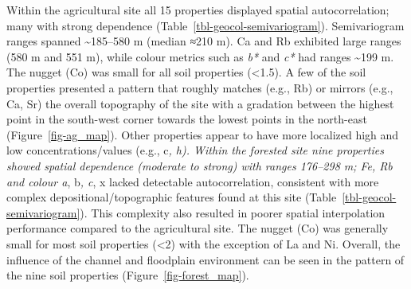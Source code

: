 \documentclass[
  number]{elsarticle}
\begin{document}
Within the agricultural site all 15 properties displayed spatial
autocorrelation; many with strong dependence
(Table~\ref{tbl-geocol-semivariogram}). Semivariogram ranges spanned
\textasciitilde185--580 m (median ≈210 m). Ca and Rb exhibited large
ranges (580 m and 551 m), while colour metrics such as \emph{b*} and
\emph{c*} had ranges \textasciitilde199 m. The nugget (Co) was small for
all soil properties (\textless1.5). A few of the soil properties
presented a pattern that roughly matches (e.g., Rb) or mirrors (e.g.,
Ca, Sr) the overall topography of the site with a gradation between the
highest point in the south-west corner towards the lowest points in the
north-east (Figure~\ref{fig-ag_map}). Other properties appear to have
more localized high and low concentrations/values (e.g., c\emph{, h).
Within the forested site nine properties showed spatial dependence
(moderate to strong) with ranges 176--298 m; Fe, Rb and colour a},
b\emph{, c}, x lacked detectable autocorrelation, consistent with more
complex depositional/topographic features found at this site
(Table~\ref{tbl-geocol-semivariogram}). This complexity also resulted in
poorer spatial interpolation performance compared to the agricultural
site. The nugget (Co) was generally small for most soil properties
(\textless2) with the exception of La and Ni. Overall, the influence of
the channel and floodplain environment can be seen in the pattern of the
nine soil properties (Figure~\ref{fig-forest_map}).
\end{document}
